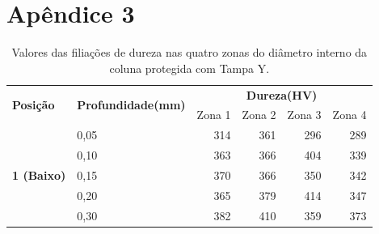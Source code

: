 \section{Apêndice 3}\label{ap:comp_filiacoes_4_zonas_col_Y}
\begin{table}
    \centering
    \caption[Valores das filiações de dureza nas 4 zonas do diâmetro interno da coluna Y.]%
    {Valores das filiações de dureza nas quatro zonas do diâmetro interno da coluna protegida com Tampa Y.}
    \label{tab:resultados_dureza_DB45_Col_Y}
    \begin{tabular}{clrrrr} 
    \toprule
    \multicolumn{1}{l}{\multirow{2}{*}{\textbf{Posição}}} & \multicolumn{1}{c}{\multirow{2}{*}{\textbf{ Profundidade(mm)}}} & \multicolumn{4}{c}{\textbf{Dureza(HV)}}                                                                            \\ 
    \cline{3-6}
    \multicolumn{1}{l}{}                                  & \multicolumn{1}{c}{}                                            & \multicolumn{1}{c}{Zona 1} & \multicolumn{1}{c}{Zona 2} & \multicolumn{1}{c}{Zona 3} & \multicolumn{1}{c}{Zona 4}  \\ 
    \hline\hline
    \multirow{8}{*}{\textbf{1 (Baixo)}}                   & 0,05                                                            & 314                        & 361                        & 296                        & 289                         \\
                                                          & 0,10                                                            & 363                        & 366                        & 404                        & 339                         \\
                                                          & 0,15                                                            & 370                        & 366                        & 350                        & 342                         \\
                                                          & 0,20                                                            & 365                        & 379                        & 414                        & 347                         \\
                                                          & 0,30                                                            & 382                        & 410                        & 359                        & 373                         \\

\end{tabular}
\end{table}
